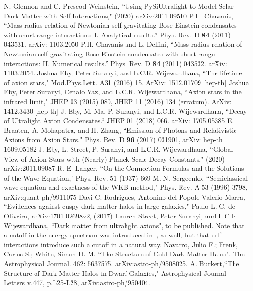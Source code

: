 \documentclass[aps,prl,twocolumn]{revtex4}
\begin{document}
\begin{thebibliography}{100}
 N. Glennon and C. Prescod-Weinstein, ``Using PySiUltralight to Model Sclar Dark Matter with Self-Interactions," (2020) arXiv:2011.09510
  P.H. Chavanis, ``Mass-radius relation of Newtonian self-gravitating Bose-Einstein condensates with short-range interactions: I. Analytical results.'' Phys. Rev. D {\bf84} (2011) 043531. arXiv: 1103.2050
 P.H. Chavanis and L. Delfini, ``Mass-radius relation of Newtonian self-gravitating Bose-Einstein condensates with short-range interactions: II. Numerical results.'' Phys. Rev. D {\bf84} (2011) 043532. arXiv: 1103.2054.
 Joshua Eby, Peter Suranyi, and L.C.R. Wijewardhana, ``The lifetime of axion stars," Mod.Phys.Lett. A31 (2016) 15.  ArXiv: 1512.01709 [hep-th]
 Joshua Eby, Peter Suranyi, Cenalo Vaz, and L.C.R. Wijewardhana, ``Axion stars in the infrared limit," JHEP 03 (2015) 080, JHEP 11 (2016) 134 (erratum).  ArXiv: 1412.3430 [hep-th]
  J. Eby, M. Ma, P. Suranyi, and L.C.R. Wijewardhana, ``Decay of Ultralight Axion Condensates.“ JHEP 01 (2018) 066. arXiv: 1705.05385
     E. Braaten, A. Mohapatra, and H. Zhang, ``Emission of Photons and Relativistic Axions from Axion Stars." Phys. Rev. D {\bf96} (2017) 031901, arXiv: hep-th 1609.05182
 J. Eby, L. Street, P. Suranyi, and L.C.R. Wijewardhana, ``Global View of Axion Stars with (Nearly) Planck-Scale Decay Constants," (2020) arXiv:2011.09087
 R. E. Langer, ``On the Connection Formulas and the Solutions of the Wave Equation," Phys. Rev. 51 (1937) 669
  M. N. Sergeenko, ``Semiclassical wave equation and exactness of the WKB method,"  Phys. Rev. A 53 (1996) 3798, arXiv:quant-ph/9911075
   Davi C. Rodrigues, Antonino del Popolo Valerio Marra, ``Evidences against cuspy dark matter halos in large galaxies,"
Paulo L. C. de Oliveira, arXiv:1701.02698v2, (2017)
 Lauren Street, Peter Suranyi, and L.C.R. Wijewardhana, ``Dark matter from ultralight axions", to be published.  
 Note that a cutoff in the energy spectrum was introduced in~\cite{Lin}, as well, but that self-interactions introduce such a cutoff in a natural way. 
 Navarro, Julio F.; Frenk, Carlos S.; White, Simon D. M.  ``The Structure of Cold Dark Matter Halos". The Astrophysical Journal. 462: 563?575. arXiv:astro-ph/9508025.
 A. Burkert,``The Structure of Dark Matter Halos in Dwarf Galaxies," Astrophysical Journal Letters v.447, p.L25-L28,  arXiv:astro-ph/950404.
\end{thebibliography}
\end{document}
